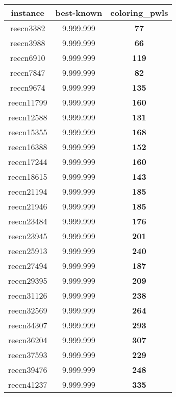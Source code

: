 \begin{tabular}{cc||c}
instance & best-known & coloring\_pwls \\ 
 \hline 
reecn3382        & 9.999.999        & {\bf 77}        \\ 
reecn3988        & 9.999.999        & {\bf 66}        \\ 
reecn6910        & 9.999.999        & {\bf 119}       \\ 
reecn7847        & 9.999.999        & {\bf 82}        \\ 
reecn9674        & 9.999.999        & {\bf 135}       \\ 
reecn11799       & 9.999.999        & {\bf 160}       \\ 
reecn12588       & 9.999.999        & {\bf 131}       \\ 
reecn15355       & 9.999.999        & {\bf 168}       \\ 
reecn16388       & 9.999.999        & {\bf 152}       \\ 
reecn17244       & 9.999.999        & {\bf 160}       \\ 
reecn18615       & 9.999.999        & {\bf 143}       \\ 
reecn21194       & 9.999.999        & {\bf 185}       \\ 
reecn21946       & 9.999.999        & {\bf 185}       \\ 
reecn23484       & 9.999.999        & {\bf 176}       \\ 
reecn23945       & 9.999.999        & {\bf 201}       \\ 
reecn25913       & 9.999.999        & {\bf 240}       \\ 
reecn27494       & 9.999.999        & {\bf 187}       \\ 
reecn29395       & 9.999.999        & {\bf 209}       \\ 
reecn31126       & 9.999.999        & {\bf 238}       \\ 
reecn32569       & 9.999.999        & {\bf 264}       \\ 
reecn34307       & 9.999.999        & {\bf 293}       \\ 
reecn36204       & 9.999.999        & {\bf 307}       \\ 
reecn37593       & 9.999.999        & {\bf 229}       \\ 
reecn39476       & 9.999.999        & {\bf 248}       \\ 
reecn41237       & 9.999.999        & {\bf 335}       \\ 

\end{tabular}
